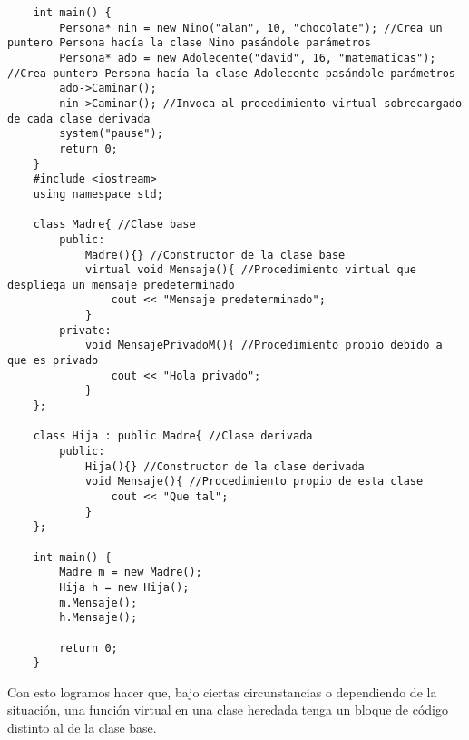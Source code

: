 \begin{lstlisting}
    int main() {
        Persona* nin = new Nino("alan", 10, "chocolate"); //Crea un puntero Persona hacía la clase Nino pasándole parámetros
        Persona* ado = new Adolecente("david", 16, "matematicas"); //Crea puntero Persona hacía la clase Adolecente pasándole parámetros
        ado->Caminar();
        nin->Caminar(); //Invoca al procedimiento virtual sobrecargado de cada clase derivada
        system("pause");
        return 0;
    }
    #include <iostream>
    using namespace std;
    
    class Madre{ //Clase base
        public:
            Madre(){} //Constructor de la clase base
            virtual void Mensaje(){ //Procedimiento virtual que despliega un mensaje predeterminado
                cout << "Mensaje predeterminado";
            }
        private:
            void MensajePrivadoM(){ //Procedimiento propio debido a que es privado
                cout << "Hola privado";
            }
    };
    
    class Hija : public Madre{ //Clase derivada
        public:
            Hija(){} //Constructor de la clase derivada
            void Mensaje(){ //Procedimiento propio de esta clase
                cout << "Que tal";
            }
    };
    
    int main() {
        Madre m = new Madre();
        Hija h = new Hija();
        m.Mensaje();
        h.Mensaje();
        
        return 0;
    }
\end{lstlisting}

Con esto logramos hacer que, bajo ciertas circunstancias o dependiendo de la situación, una función virtual en una clase heredada tenga un bloque de código distinto al de la clase base.

